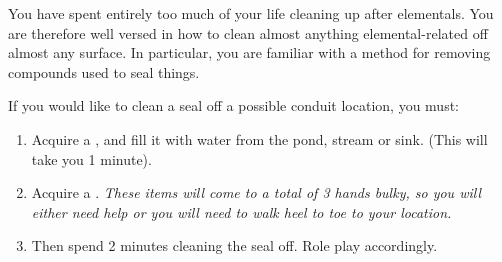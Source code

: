 \documentclass[green]{elementals}
\begin{document}
\name{\gUnsealConduit{}} 

You have spent entirely too much of your life cleaning up after elementals. You are therefore well versed in how to clean almost anything elemental-related off almost any surface. In particular, you are familiar with a method for removing compounds used to seal things. 

If you would like to clean a seal off a possible conduit location, you must: 
\begin{enumerate}
\item Acquire a \iBowl{}, and fill it with water from the pond, stream or sink. (This will take you 1 minute).
\item Acquire a \iLye{}. \emph{These items will come to a total of 3 hands bulky, so you will either need help or you will need to  walk heel to toe to your location.} 
\item Then spend 2 minutes cleaning the seal off. Role play accordingly.
\end{enumerate}
\end{document}

